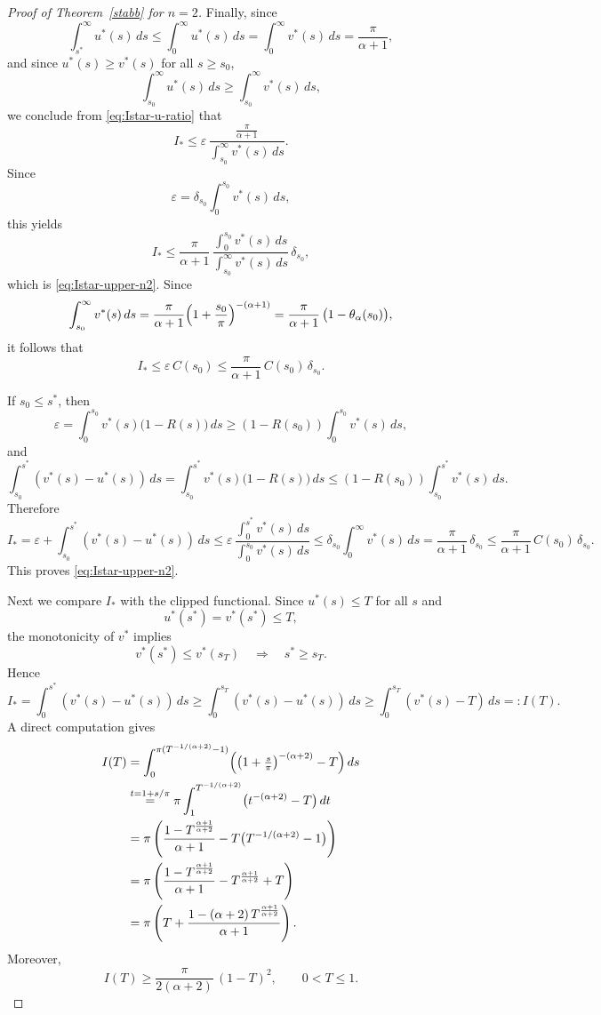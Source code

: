 \documentclass[a4paper,10pt]{amsart}
\begin{document}
\begin{proof}[Proof of Theorem~\ref{stabb} for $n=2$]
Finally, since
\[
\int_{s^*}^{\infty}u^*(s)\,ds
\le
\int_0^\infty u^*(s)\,ds
=
\int_0^\infty v^*(s)\,ds
=
\frac{\pi}{\alpha+1},
\]
and since $u^*(s)\ge v^*(s)$ for all $s\ge s_0$,
\[
\int_{s_0}^{\infty}u^*(s)\,ds
\ge
\int_{s_0}^{\infty}v^*(s)\,ds,
\]
we conclude from \eqref{eq:Istar-u-ratio} that
\[
I_*
\le
\varepsilon\,
\frac{\frac{\pi}{\alpha+1}}{\int_{s_0}^{\infty}v^*(s)\,ds}.
\]
Since
\[
\varepsilon=\delta_{s_0}\int_0^{s_0}v^*(s)\,ds,
\]
this yields
\[
I_*
\le
\frac{\pi}{\alpha+1}\,
\frac{\int_0^{s_0}v^*(s)\,ds}{\int_{s_0}^{\infty}v^*(s)\,ds}\,
\delta_{s_0},
\]
which is \eqref{eq:Istar-upper-n2}.
Since
\[
\int_{s_0}^{\infty}v^*(s)\,ds
=
\frac{\pi}{\alpha+1}\Bigl(1+\frac{s_0}{\pi}\Bigr)^{-(\alpha+1)}
=
\frac{\pi}{\alpha+1}\,\bigl(1-\theta_\alpha(s_0)\bigr),
\]
it follows that
\[
I_* \le \varepsilon\, C(s_0)\le \frac{\pi}{\alpha+1}\,C(s_0)\,\delta_{s_0}.
\]

If $s_0\le s^*$, then
\[
\varepsilon=\int_0^{s_0}v^*(s)\bigl(1-R(s)\bigr)\,ds
\ge
(1-R(s_0))\int_0^{s_0}v^*(s)\,ds,
\]
and
\[
\int_{s_0}^{s^*}(v^*(s)-u^*(s))\,ds
=
\int_{s_0}^{s^*}v^*(s)\bigl(1-R(s)\bigr)\,ds
\le
(1-R(s_0))\int_{s_0}^{s^*}v^*(s)\,ds.
\]
Therefore
\[
I_*=\varepsilon+\int_{s_0}^{s^*}(v^*(s)-u^*(s))\,ds
\le
\varepsilon\,
\frac{\int_0^{s^*}v^*(s)\,ds}{\int_0^{s_0}v^*(s)\,ds}
\le
\delta_{s_0}\int_0^\infty v^*(s)\,ds
=
\frac{\pi}{\alpha+1}\,\delta_{s_0}
\le
\frac{\pi}{\alpha+1}\,C(s_0)\,\delta_{s_0}.
\]
This proves \eqref{eq:Istar-upper-n2}.

Next we compare $I_*$ with the clipped functional. Since $u^*(s)\le T$ for all $s$ and
\[
u^*(s^*)=v^*(s^*)\le T,
\]
the monotonicity of $v^*$ implies
\[
v^*(s^*)\le v^*(s_T)
\quad\Longrightarrow\quad
s^*\ge s_T.
\]
Hence
\[
I_*
=
\int_0^{s^*}(v^*(s)-u^*(s))\,ds
\ge
\int_0^{s_T}(v^*(s)-u^*(s))\,ds
\ge
\int_0^{s_T}(v^*(s)-T)\,ds
=:I(T).
\]
A direct computation gives
\begin{align*}
I(T)
&=\int_0^{\pi(T^{-1/(\alpha+2)}-1)}
\Bigl(\bigl(1+\tfrac{s}{\pi}\bigr)^{-(\alpha+2)}-T\Bigr)\,ds\\
&\stackrel{t=1+s/\pi}{=}
\pi\int_1^{T^{-1/(\alpha+2)}}\bigl(t^{-(\alpha+2)}-T\bigr)\,dt\\
&=
\pi\left(
\frac{1-T^{\frac{\alpha+1}{\alpha+2}}}{\alpha+1}
-T\bigl(T^{-1/(\alpha+2)}-1\bigr)
\right)\\
&=
\pi\left(
\frac{1-T^{\frac{\alpha+1}{\alpha+2}}}{\alpha+1}
-T^{\frac{\alpha+1}{\alpha+2}}+T
\right)\\
&=
\pi\left(
T+\frac{1-(\alpha+2)\,T^{\frac{\alpha+1}{\alpha+2}}}{\alpha+1}
\right).
\end{align*}
Moreover,
\begin{equation}\label{eq:I-lower-quad-fixed}
I(T)\ge \frac{\pi}{2(\alpha+2)}\,(1-T)^2,\qquad 0<T\le 1.
\end{equation}


\end{proof}
\end{document}
